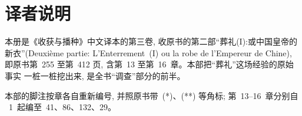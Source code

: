 \documentclass[
    PaperSize=a4paper,
    HeadingFont=hei,
    Biblatex=false,
    BookTitleCN={收获与播种},
    Translator={数译},
    LogoFile=logo.pdf
]{mathtranslation}
\begin{document}
\frontmatter
\makecover

\chapter*{译者说明}

本册是《收获与播种》中文译本的第三卷, 收原书的第二部“葬礼(I):或中国皇帝的
新衣”(Deuxième partie: L'Enterrement~(I) ou la robe de l'Empereur de Chine),
即原书第~255 至第~412 页, 含第~13 至第~16~章。本部把“葬礼”这场经验的原始事实
一桩一桩挖出来, 是全书“调查”部分的前半。

本部的脚注按章各自重新编号, 并照原书带~(*)、(**) 等角标; 第~13--16~章分别自
~1~起编至~41、86、132、29。

\CommonNoteBody

\makecontents

\mainmatter


\dedication{%
献给曾是我朋友的人,\\[0.5em]
既献给少数仍是朋友的人,\\[0.5em]
也献给众多前来为我的葬礼齐声唱和的人。\\[2em]
纪念那场难忘的讨论会……\\[0.5em]
以及全体教众……%
}

\setcounter{chapter}{12}





\end{document}
